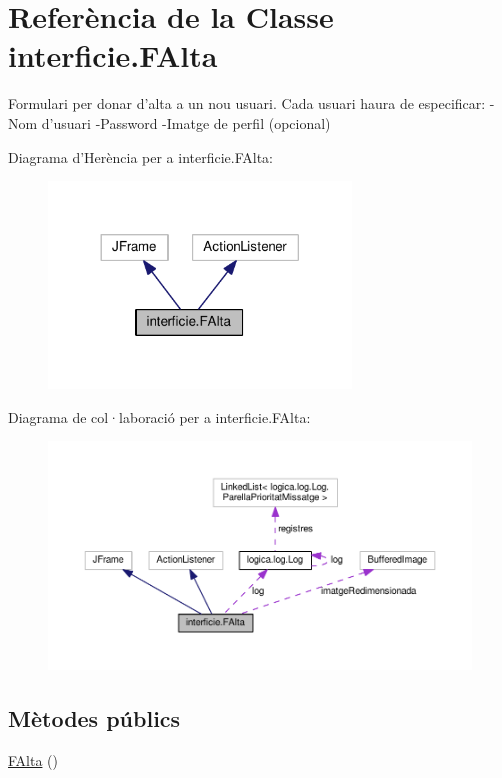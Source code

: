 \hypertarget{classinterficie_1_1_f_alta}{\section{Referència de la Classe interficie.\+F\+Alta}
\label{classinterficie_1_1_f_alta}
}


Formulari per donar d'alta a un nou usuari. Cada usuari haura de especificar\+: -\/\+Nom d'usuari -\/\+Password -\/\+Imatge de perfil (opcional)  




Diagrama d'Herència per a interficie.\+F\+Alta\+:
\nopagebreak
\begin{figure}[H]
\begin{center}
\leavevmode
\includegraphics[width=228pt]{classinterficie_1_1_f_alta__inherit__graph}
\end{center}
\end{figure}


Diagrama de col·laboració per a interficie.\+F\+Alta\+:
\nopagebreak
\begin{figure}[H]
\begin{center}
\leavevmode
\includegraphics[width=350pt]{classinterficie_1_1_f_alta__coll__graph}
\end{center}
\end{figure}
\subsection*{Mètodes públics}
\begin{DoxyCompactItemize}
\item 
\hyperlink{classinterficie_1_1_f_alta_ad9049ce9f00f165a714f7d343227cb97}{F\+Alta} ()
\end{DoxyCompactItemize}
